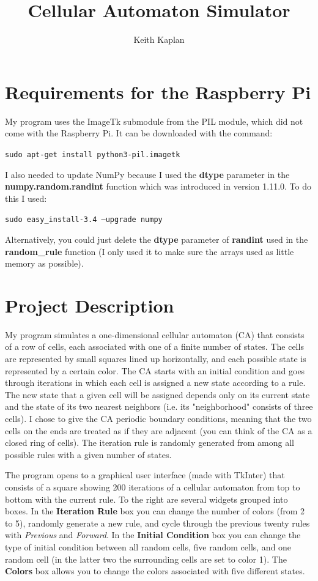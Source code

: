 \documentclass[12pt]{article}
\begin{document}
\title{Cellular Automaton Simulator}
\author{Keith Kaplan}
\date{}
\maketitle
{}
\newpage
{}

\section{Requirements for the Raspberry Pi}
My program uses the ImageTk submodule from the PIL module, which did not come with the Raspberry Pi.  It can be downloaded with the command:
\begin{center}\texttt{sudo apt-get install python3-pil.imagetk}\end{center}
I also needed to update NumPy because I used the \textbf{dtype} parameter in the \textbf{numpy.random.randint} function which was introduced in version 1.11.0.  To do this I used:
\begin{center}\texttt{sudo easy\_install-3.4 --upgrade numpy}\end{center}
Alternatively, you could just delete the \textbf{dtype} parameter of \textbf{randint} used in the \textbf{random\_rule} function (I only used it to make sure the arrays used as little memory as possible).

\section{Project Description}
My program simulates a one-dimensional cellular automaton (CA) that consists of a row of cells, each associated with one of a finite number of states.
The cells are represented by small squares lined up horizontally, and each possible state is represented by a certain color.
The CA starts with an initial condition and goes through iterations in which each cell is assigned a new state according to a rule.
The new state that a given cell will be assigned depends only on its current state and the state of its two nearest neighbors (i.e. its "neighborhood" consists of three cells).
I chose to give the CA periodic boundary conditions, meaning that the two cells on the ends are treated as if they are adjacent (you can think of the CA as a closed ring of cells).
The iteration rule is randomly generated from among all possible rules with a given number of states.

The program opens to a graphical user interface (made with TkInter) that consists of a square showing 200 iterations of a cellular automaton from top to bottom with the current rule.  To the right are several widgets grouped into boxes.
In the \textbf{Iteration Rule} box you can change the number of colors (from 2 to 5), randomly generate a new rule, and cycle through the previous twenty rules with \textit{Previous} and \textit{Forward}.
In the \textbf{Initial Condition} box you can change the type of initial condition between all random cells, five random cells, and one random cell (in the latter two the surrounding cells are set to color 1).
The \textbf{Colors} box allows you to change the colors associated with five different states.
\end{document}
